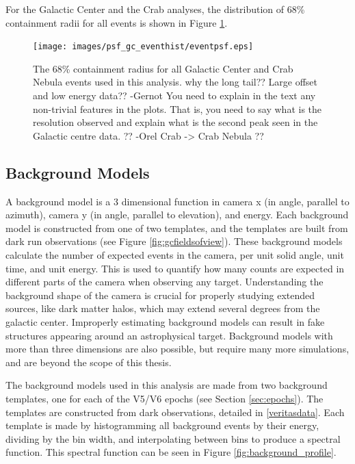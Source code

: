     For the Galactic Center and the Crab analyses, the distribution of 68\% containment radii for all events is shown in Figure \ref{fig:gc_psf_hist}.

    \begin{figure}[ht]
      \centering
      \texttt{[image: images/psf\_gc\_eventhist/eventpsf.eps]}
      \caption[Crab and Galactic Center Event PSFs]{
        The 68\% containment radius for all Galactic Center and Crab Nebula events used in this analysis.
        {\color{red}why the long tail?? Large offset and low energy data?? -Gernot}
        {\color{red}You need to explain in the text any non-trivial features in the plots. That is, you need to say what is the resolution observed and explain what is the second peak seen in the Galactic centre data. ?? -Orel}
        {\color{red}Crab -> Crab Nebula ??}
      }
      \label{fig:gc_psf_hist}
    \end{figure}
  
  \FloatBarrier
  
  \subsection{Background Models}\label{background_production}
  
    A background model is a 3 dimensional function in camera x (in angle, parallel to azimuth), camera y (in angle, parallel to elevation), and energy.
    Each background model is constructed from one of two templates, and the templates are built from dark run observations (see Figure \ref{fig:gcfieldsofview}).
    These background models calculate the number of expected events in the camera, per unit solid angle, unit time, and unit energy.
    This is used to quantify how many counts are expected in different parts of the camera when observing any target.
    Understanding the background shape of the camera is crucial for properly studying extended sources, like dark matter halos, which may extend several degrees from the galactic center.
    Improperly estimating background models can result in fake structures appearing around an astrophysical target.
    Background models with more than three dimensions are also possible, but require many more simulations, and are beyond the scope of this thesis.
    
    The background models used in this analysis are made from two background templates, one for each of the V5/V6 epochs (see Section \ref{sec:epochs}).
    The templates are constructed from dark observations, detailed in \ref{veritasdata}.
    Each template is made by histogramming all background events by their energy, dividing by the bin width, and interpolating between bins to produce a spectral function.
    This spectral function can be seen in Figure \ref{fig:background_profile}.
    
